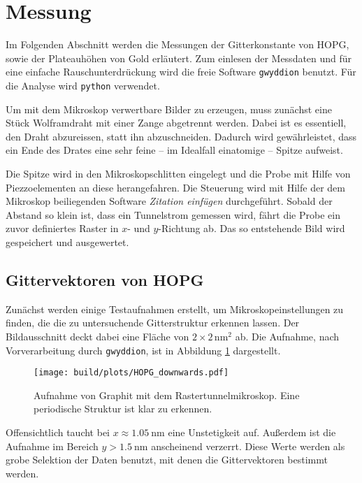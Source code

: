\section{Messung} %
\label{sec:messung}
Im Folgenden Abschnitt werden die Messungen der Gitterkonstante von HOPG, sowie
der Plateauhöhen von Gold erläutert. Zum einlesen der Messdaten und für eine
einfache Rauschunterdrückung wird die freie Software \texttt{gwyddion}
\cite{gwyddion} benutzt. Für die Analyse wird \texttt{python} \cite{python3}
verwendet.

Um mit dem Mikroskop verwertbare Bilder zu erzeugen, muss zunächst eine Stück
Wolframdraht mit einer Zange abgetrennt werden. Dabei ist es essentiell, den
Draht abzureissen, statt ihn abzuschneiden. Dadurch wird gewährleistet, dass
ein Ende des Drates eine sehr feine -- im Idealfall einatomige -- Spitze
aufweist.

Die Spitze wird in den Mikroskopschlitten eingelegt und die Probe mit Hilfe von
Piezzoelementen an diese herangefahren. Die Steuerung wird mit Hilfe der dem
Mikroskop beiliegenden Software \emph{Zitation einfügen} durchgeführt.
Sobald der Abstand so klein ist, dass ein Tunnelstrom gemessen wird, fährt
die Probe ein zuvor definiertes Raster in $x$- und $y$-Richtung ab. Das so
entstehende Bild wird gespeichert und ausgewertet.

\subsection{Gittervektoren von HOPG}
\label{subsec:gitter}
Zunächst werden einige Testaufnahmen erstellt, um Mikroskopeinstellungen zu
finden, die die zu untersuchende Gitterstruktur erkennen lassen.
Der Bildausschnitt deckt dabei eine Fläche von $\num{2}\times\num{2}\,
\si{\nano\meter\squared}$ ab. Die Aufnahme, nach Vorverarbeitung durch
\texttt{gwyddion}, ist in Abbildung \ref{fig:hopg1} dargestellt.
\begin{figure}
    \centering
    \texttt{[image: build/plots/HOPG\_downwards.pdf]}
    \caption{Aufnahme von Graphit mit dem Rastertunnelmikroskop. Eine
             periodische Struktur ist klar zu erkennen.}
    \label{fig:hopg1}
\end{figure}
Offensichtlich taucht bei $x \approx \SI{1.05}{\nano\meter}$ eine Unstetigkeit
auf. Außerdem ist die Aufnahme im Bereich $y > \SI{1.5}{\nano\meter}$
anscheinend verzerrt. Diese Werte werden als grobe Selektion der Daten
benutzt, mit denen die Gittervektoren bestimmt werden.

